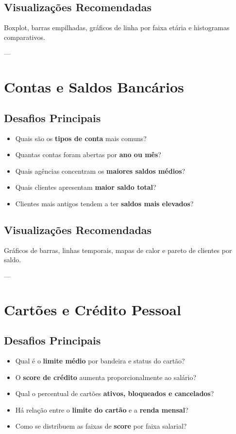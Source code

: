 \begin{appendices}
\subsection*{Visualizações Recomendadas}
Boxplot, barras empilhadas, gráficos de linha por faixa etária e histogramas comparativos.

---

\section{Contas e Saldos Bancários}

\subsection*{Desafios Principais}
\begin{itemize}
  \item Quais são os \textbf{tipos de conta} mais comuns?
  \item Quantas contas foram abertas por \textbf{ano ou mês}?
  \item Quais agências concentram os \textbf{maiores saldos médios}?
  \item Quais clientes apresentam \textbf{maior saldo total}?
  \item Clientes mais antigos tendem a ter \textbf{saldos mais elevados}?
\end{itemize}

\subsection*{Visualizações Recomendadas}
Gráficos de barras, linhas temporais, mapas de calor e pareto de clientes por saldo.

---

\section{Cartões e Crédito Pessoal}

\subsection*{Desafios Principais}
\begin{itemize}
  \item Qual é o \textbf{limite médio} por bandeira e status do cartão?
  \item O \textbf{score de crédito} aumenta proporcionalmente ao salário?
  \item Qual o percentual de cartões \textbf{ativos, bloqueados e cancelados}?
  \item Há relação entre o \textbf{limite do cartão} e a \textbf{renda mensal}?
  \item Como se distribuem as faixas de \textbf{score} por faixa salarial?
\end{itemize}


\end{appendices}
